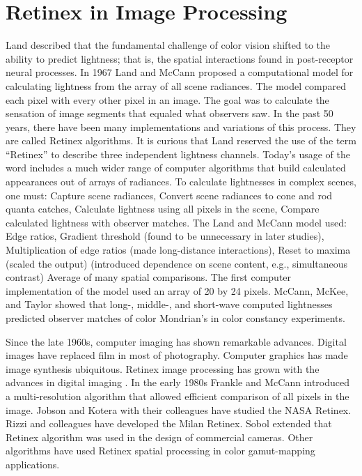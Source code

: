 \section{Retinex in Image Processing}
Land described that the fundamental challenge of color vision shifted to the ability to predict lightness; that is, the spatial interactions found in post-receptor neural processes. In 1967 Land and McCann proposed a computational model for calculating lightness from the array of all scene radiances. The model compared each pixel with every other pixel in an image. The goal was to calculate the sensation of image segments that equaled what observers saw. In the past 50 years, there have been many implementations and variations of this process. They are called Retinex algorithms. It is curious that Land reserved the use of the term “Retinex” to describe three independent lightness channels. Today’s usage of the word includes a much wider range of computer algorithms that build calculated appearances out of arrays of radiances. To calculate lightnesses in complex scenes, one must: Capture scene radiances, Convert scene radiances to cone and rod quanta catches, Calculate lightness using all pixels in the scene, Compare calculated lightness with observer matches. The Land and McCann model used: Edge ratios, Gradient threshold (found to be unnecessary in later studies), Multiplication of edge ratios (made long-distance interactions), Reset to maxima (scaled the output) (introduced dependence on scene content, e.g., simultaneous contrast) Average of many spatial comparisons. The first computer implementation of the model used an array of 20 by 24 pixels. McCann, McKee, and Taylor showed that long-, middle-, and short-wave computed lightnesses predicted observer matches of color Mondrian’s in color constancy experiments.

Since the late 1960s, computer imaging has shown remarkable advances. Digital images have replaced film in most of photography. Computer graphics has made image synthesis ubiquitous. Retinex image processing has grown with the advances in digital imaging . In the early 1980s Frankle and McCann introduced a multi-resolution algorithm that allowed efficient comparison of all pixels in the image. Jobson and Kotera with their colleagues have studied the NASA Retinex. Rizzi and colleagues have developed the Milan Retinex. Sobol extended that Retinex algorithm was used in the design of commercial cameras. Other algorithms have used Retinex spatial processing in color gamut-mapping applications.

